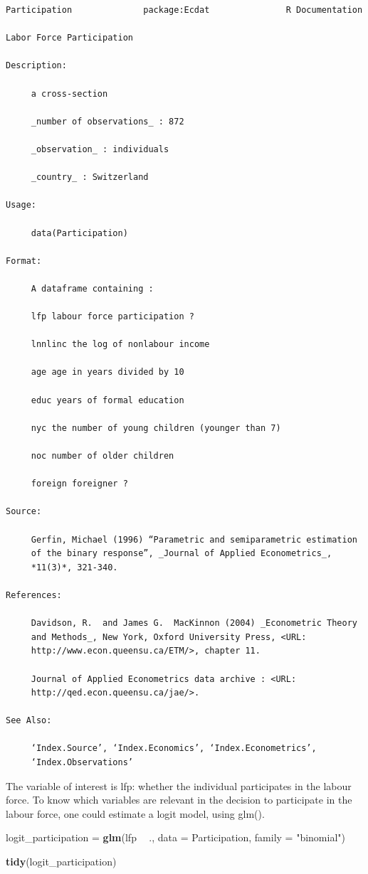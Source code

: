 \documentclass[]{gitbook}
\newenvironment{Shaded}{\begin{snugshade}}{\end{snugshade}}
\newcommand{\DataTypeTok}[1]{\textcolor[rgb]{0.13,0.29,0.53}{#1}}
\newcommand{\KeywordTok}[1]{\textcolor[rgb]{0.13,0.29,0.53}{\textbf{#1}}}
\newcommand{\NormalTok}[1]{#1}
\newcommand{\OperatorTok}[1]{\textcolor[rgb]{0.81,0.36,0.00}{\textbf{#1}}}
\newcommand{\StringTok}[1]{\textcolor[rgb]{0.31,0.60,0.02}{#1}}
\theoremstyle{definition}
\theoremstyle{definition}
\theoremstyle{definition}
\theoremstyle{remark}
\begin{document}
\begin{verbatim}
Participation              package:Ecdat               R Documentation

Labor Force Participation

Description:

     a cross-section

     _number of observations_ : 872

     _observation_ : individuals

     _country_ : Switzerland

Usage:

     data(Participation)

Format:

     A dataframe containing :

     lfp labour force participation ?

     lnnlinc the log of nonlabour income

     age age in years divided by 10

     educ years of formal education

     nyc the number of young children (younger than 7)

     noc number of older children

     foreign foreigner ?

Source:

     Gerfin, Michael (1996) “Parametric and semiparametric estimation
     of the binary response”, _Journal of Applied Econometrics_,
     *11(3)*, 321-340.

References:

     Davidson, R.  and James G.  MacKinnon (2004) _Econometric Theory
     and Methods_, New York, Oxford University Press, <URL:
     http://www.econ.queensu.ca/ETM/>, chapter 11.

     Journal of Applied Econometrics data archive : <URL:
     http://qed.econ.queensu.ca/jae/>.

See Also:

     ‘Index.Source’, ‘Index.Economics’, ‘Index.Econometrics’,
     ‘Index.Observations’
\end{verbatim}

The variable of interest is lfp: whether the individual participates in
the labour force. To know which variables are relevant in the decision
to participate in the labour force, one could estimate a logit model,
using glm().

\begin{Shaded}
\begin{Highlighting}[]
\NormalTok{logit_participation =}\StringTok{ }\KeywordTok{glm}\NormalTok{(lfp }\OperatorTok{~}\StringTok{ }\NormalTok{., }\DataTypeTok{data =}\NormalTok{ Participation, }\DataTypeTok{family =} \StringTok{"binomial"}\NormalTok{)}

\KeywordTok{tidy}\NormalTok{(logit_participation)}
\end{Highlighting}
\end{Shaded}
\end{document}
